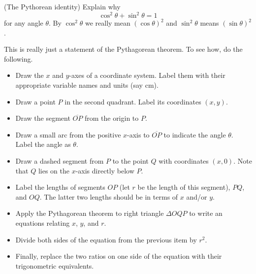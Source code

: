 \documentclass{ximera}
\begin{document}
\begin{question} \label{Q234234hg:Cosine}
(The Pythorean identity) Explain why
\[
  \cos^2\theta + \sin^2 \theta = 1
\]
for any angle $\theta$. By $\cos^2\theta$ we really mean  $(\cos \theta)^2$ and $\sin^2\theta$ means $(\sin\theta)^2$.

\begin{explanation}
This is really just a statement of the Pythagorean theorem. To see how, do the following.
\begin{itemize}

\item{Draw the $x$ and $y$-axes of a coordinate system. Label them with their appropriate variable names and units (say cm).}

\item{Draw a point $P$ in the second quadrant. Label its coordinates $(x,y)$.}

\item{Draw the segment $\overline{OP}$ from the origin to $P$.}

\item{Draw a small arc from the positive $x$-axis to $\overline{OP}$ to indicate the angle $\theta$. Label the angle as $\theta$.}

\item{Draw a dashed segment from $P$ to the point $Q$ with coordinates $(x,0)$. Note that $Q$ lies on the $x$-axis directly below $P$.}

\item{Label the lengths of segments $OP$ (let $r$ be the length of this segment), $PQ$, and $OQ$. The latter two lengths should be in terms of $x$ and/or $y$.}

\item{Apply the Pythagorean theorem to right triangle $\Delta OQP$ to write an equations relating $x$, $y$, and $r$.}

\item{Divide both sides of the equation from the previous item by $r^2$.}

\item{Finally, replace the two ratios on one side of the equation with their trigonometric equivalents.}



\end{itemize}
\end{explanation}

\end{question}
\end{document}
